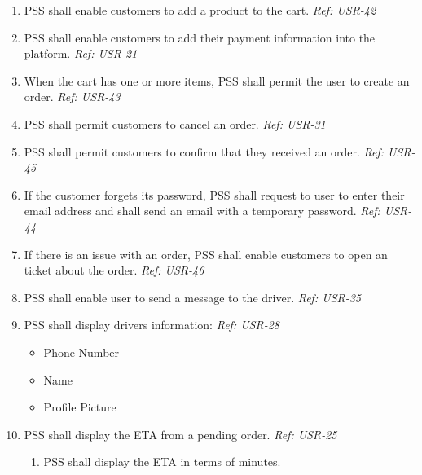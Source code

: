     \begin{enumerate}[resume, label=SY-\arabic*]
    \item PSS shall enable customers to add a product to the cart.
    \newline \textit{Ref: USR-42}
    \item PSS shall enable customers to add their payment information 
    into the platform.
    \newline \textit{Ref: USR-21}
    \item When the cart has one or more items, PSS shall permit the user to 
    create an order.
    \newline \textit{Ref: USR-43}
    \item PSS shall permit customers to cancel an order.
    \newline \textit{Ref: USR-31}
    \item PSS shall permit customers to confirm that they received an order.
    \newline \textit{Ref: USR-45}
    \item If the customer forgets its password, PSS shall request to user to 
    enter their email address and shall send an email with a temporary 
    password.
    \newline \textit{Ref: USR-44}
    \item If there is an issue with an order, PSS shall enable customers to 
    open an ticket about the order.
    \newline \textit{Ref: USR-46}
    \item PSS shall enable user to send a message to the driver.
    \newline \textit{Ref: USR-35}
    \item PSS shall display drivers information:
    \newline \textit{Ref: USR-28}
    \begin{itemize}
        \item Phone Number
        \item Name
        \item Profile Picture
    \end{itemize}
    \item PSS shall display the ETA from a pending order.
    \newline \textit{Ref: USR-25}
    \begin{enumerate}[label=SY-21.\arabic*]
        \item PSS shall display the ETA in terms of minutes.
    \end{enumerate}

\end{enumerate}

